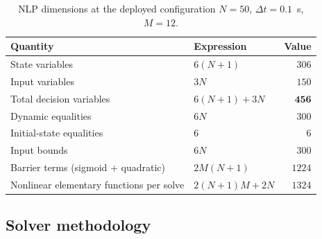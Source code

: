 \documentclass[11pt,a4paper]{article}
\begin{document}
\begin{table}[htbp]
  \centering
  \small
  \caption{NLP dimensions at the deployed configuration $N=50$, $\Delta t=0.1$~s, $M=12$.}
  \label{tab:nlp}
  \begin{tabular}{llr}
    \toprule
    Quantity & Expression & Value \\
    \midrule
    State variables            & $6(N+1)$        & $306$ \\
    Input variables            & $3N$            & $150$ \\
    Total decision variables   & $6(N+1)+3N$     & $\mathbf{456}$ \\
    Dynamic equalities         & $6N$            & $300$ \\
    Initial-state equalities   & $6$             & $6$ \\
    Input bounds               & $6N$            & $300$ \\
    Barrier terms (sigmoid + quadratic) & $2M(N+1)$ & $1224$ \\
    Nonlinear elementary functions per solve & $2(N+1)M+2N$ & $1324$ \\
    \bottomrule
  \end{tabular}
\end{table}

\subsection{Solver methodology}
\label{sec:solver}
\end{document}
